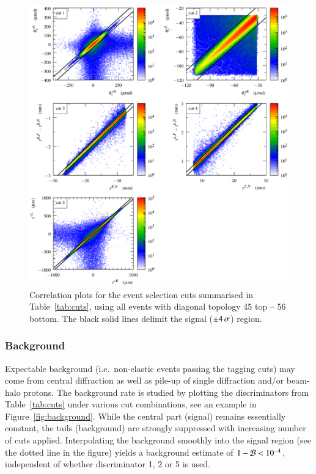 \begin{figure}
\begin{center}
\includegraphics{fig/cuts.pdf}
\caption{%
Correlation plots for the event selection cuts summarised in Table~\ref{tab:cuts}, using all events with diagonal topology 45 top -- 56 bottom. The black solid lines delimit the signal ($\pm 4\,{\rm \sigma}$) region.
}
\label{fig:cuts}
\end{center}
\end{figure}



\subsubsection{Background}
\label{sec:background}

Expectable background (i.e.~non-elastic events passing the tagging cuts) may come from central diffraction as well as pile-up of single diffraction and/or beam-halo protons. The background rate is studied by plotting the discriminators from Table~\ref{tab:cuts} under various cut combinations, see an example in Figure~\ref{fig:background}. While the central part (signal) remains essentially constant, the tails (background) are strongly suppressed with increasing number of cuts applied. Interpolating the background smoothly into the signal region (see the dotted line in the figure) yields a background estimate of $1 - {\cal B} < 10^{-4}$, independent of whether discriminator 1, 2 or 5 is used.


